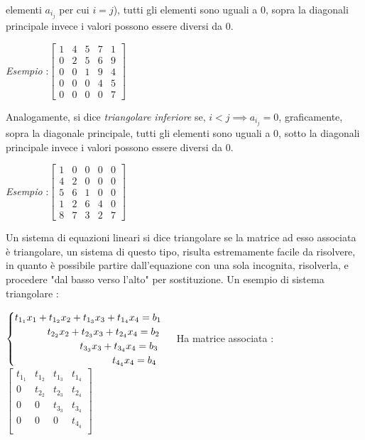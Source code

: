 \documentclass[12pt, letterpaper]{article}
\begin{document}
elementi \(a_{i_j}\) per cui \(i=j\)), tutti gli elementi sono uguali a 0, sopra la diagonali principale invece 
i valori possono essere diversi da 0.\begin{center}
     \textit{Esempio} :\(
     \begin{bmatrix}
        1&4&5&7&1\\
        0&2&5&6&9\\
        0&0&1&9&4\\
        0&0&0&4&5\\
        0&0&0&0&7
     \end{bmatrix}   
     \)
\end{center}
Analogamente, si dice \textit{triangolare 
inferiore} se, \(i<j\implies a_{i_j}=0\), graficamente, sopra la diagonale principale, tutti gli elementi sono uguali a 0, sotto la diagonali principale invece 
i valori possono essere diversi da 0.\begin{center}
    \textit{Esempio} :\(
        \begin{bmatrix}
           1&0&0&0&0\\
           4&2&0&0&0\\
           5&6&1&0&0\\
           1&2&6&4&0\\
           8&7&3&2&7
        \end{bmatrix}   
        \)
\end{center}
Un sistema di equazioni lineari si dice triangolare se la matrice ad esso associata è triangolare, un sistema 
di questo tipo, risulta estremamente facile da risolvere, in quanto è possibile partire dall'equazione 
con una sola incognita, risolverla, e procedere "dal basso verso l'alto" per sostituzione. Un esempio di sistema triangolare :
\begin{center}
     \(\begin{cases}
        t_{1_1}x_1+t_{1_2}x_2+t_{1_3}x_3+t_{1_4}x_4=b_1\\ 
        \text{\hphantom{aaaaaa.}}t_{2_2}x_2+t_{2_3}x_3+t_{2_4}x_4=b_2\\
        \text{\hphantom{aaaaaa.aaaaaa.}}t_{3_3}x_3+t_{3_4}x_4=b_3\\
        \text{\hphantom{aaaaaa.aaaaaa.aaaaaa.}}t_{4_4}x_4=b_4
    \end{cases}\) Ha matrice associata :\hphantom{aa} \(\begin{bmatrix}
        t_{1_1}&t_{1_2}&t_{1_3}&t_{1_4}\\
        0&t_{2_2}&t_{2_3}&t_{2_4}\\
        0&0& t_{3_3}& t_{3_4}\\
        0&0&0&t_{4_4}\\
        
     \end{bmatrix} \)
\end{center}
\end{document}
